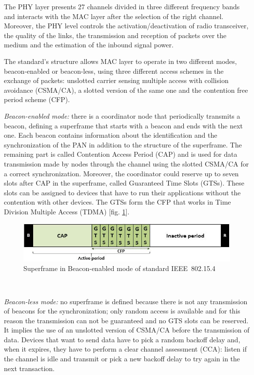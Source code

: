 \documentclass[conference]{IEEEtran}
\begin{document}
The PHY layer presents 27 channels divided in three different frequency bands and interacts with the MAC layer after the selection of the right channel. Moreover, the PHY level controls the activation/deactivation of radio transceiver, the quality of the links, the transmission and reception of packets over the medium and the estimation of the inbound signal power.

The standard's structure allows MAC layer to operate in two different modes, beacon-enabled or beacon-less, using three different access schemes in the exchange of packets: unslotted carrier sensing multiple access with collision avoidance (CSMA/CA), a slotted version of the same one and the contention free period scheme (CFP).
\newline

\textit{Beacon-enabled mode:} there is a coordinator node that periodically transmits a beacon, defining a superframe that starts with a beacon and ends with the next one. Each beacon contains information about the identification and the synchronization of the PAN in addition to the structure of the superframe. The remaining part is called Contention Access Period (CAP) and is used for data transmission made by nodes through the channel using the slotted CSMA/CA for a correct synchronization. Moreover, the coordinator could reserve up to seven slots after CAP in the superframe, called Guaranteed Time Slots (GTSs). These slots can be assigned to devices that have to run their applications without the contention with other devices. The GTSs form the CFP that works in Time Division Multiple Access (TDMA) [fig. \ref{fig_beaconenabled}].
\newline

\begin{figure}[htbp]
	\centering
	\includegraphics[width=0.9\linewidth]{img/beaconSuperframe.jpg}
	\caption{Superframe in Beacon-enabled mode of standard IEEE~802.15.4}
	\label{fig_beaconenabled}
\end{figure}\



\textit{Beacon-less mode:} no superframe is defined because there is not any transmission of beacons for the synchronization; only random access is available and for this reason the transmission can not be guaranteed and no GTS slots can be reserved. It implies the use of an unslotted version of CSMA/CA before the transmission of data. Devices that want to send data have to pick a random backoff delay and, when it expires, they have to perform a clear channel assessment (CCA): listen if the channel is idle and transmit or pick a new backoff delay to try again in the next transaction. 
\newline
\end{document}
